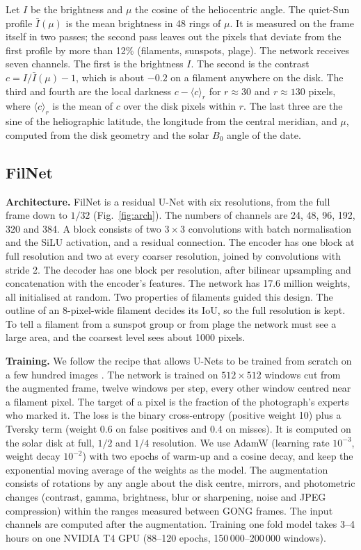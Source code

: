 \documentclass[sigconf]{acmart}
\newcommand{\trainspan}{3--4 hours on one NVIDIA T4 GPU (88--120 epochs, 150\,000--200\,000 windows)}
\begin{document}
Let $I$ be the brightness and $\mu$ the cosine of the heliocentric angle. The quiet-Sun profile $\bar I(\mu)$ is the mean brightness in 48 rings of $\mu$. It is measured on the frame itself in two passes; the second pass leaves out the pixels that deviate from the first profile by more than 12\% (filaments, sunspots, plage). The network receives seven channels. The first is the brightness $I$. The second is the contrast $c=I/\bar I(\mu)-1$, which is about $-0.2$ on a filament anywhere on the disk. The third and fourth are the local darkness $c-\langle c\rangle_r$ for $r\approx30$ and $r\approx130$ pixels, where $\langle c\rangle_r$ is the mean of $c$ over the disk pixels within $r$. The last three are the sine of the heliographic latitude, the longitude from the central meridian, and $\mu$, computed from the disk geometry and the solar $B_0$ angle of the date.

\subsection{FilNet}
\textbf{Architecture.} FilNet is a residual U-Net \cite{ronneberger2015unet,he2016resnet} with six resolutions, from the full frame down to $1/32$ (Fig.~\ref{fig:arch}). The numbers of channels are 24, 48, 96, 192, 320 and 384. A block consists of two $3\times3$ convolutions with batch normalisation and the SiLU activation, and a residual connection. The encoder has one block at full resolution and two at every coarser resolution, joined by convolutions with stride 2. The decoder has one block per resolution, after bilinear upsampling and concatenation with the encoder's features. The network has 17.6 million weights, all initialised at random. Two properties of filaments guided this design. The outline of an 8-pixel-wide filament decides its IoU, so the full resolution is kept. To tell a filament from a sunspot group or from plage the network must see a large area, and the coarsest level sees about 1000 pixels.

\textbf{Training.} We follow the recipe that allows U-Nets to be trained from scratch on a few hundred images \cite{isensee2021nnu}. The network is trained on $512\times512$ windows cut from the augmented frame, twelve windows per step, every other window centred near a filament pixel. The target of a pixel is the fraction of the photograph's experts who marked it. The loss is the binary cross-entropy (positive weight 10) plus a Tversky term (weight 0.6 on false positives and 0.4 on misses). It is computed on the solar disk at full, $1/2$ and $1/4$ resolution. We use AdamW (learning rate $10^{-3}$, weight decay $10^{-2}$) with two epochs of warm-up and a cosine decay, and keep the exponential moving average of the weights as the model. The augmentation consists of rotations by any angle about the disk centre, mirrors, and photometric changes (contrast, gamma, brightness, blur or sharpening, noise and JPEG compression) within the ranges measured between GONG frames. The input channels are computed after the augmentation. Training one fold model takes \trainspan.
\end{document}
